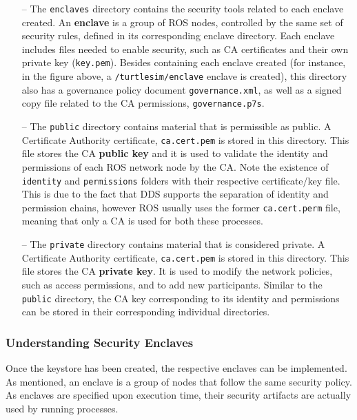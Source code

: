 \begin{itemize}
    \item[--] The \texttt{enclaves} directory contains the security tools related to each enclave created. An \textbf{enclave} is a group of ROS nodes, controlled by the same set of security rules, defined in its corresponding enclave directory. Each enclave includes files needed to enable security, such as CA certificates and their own private key (\texttt{key.pem}). Besides containing each enclave created (for instance, in the figure above, a \texttt{/turtlesim/enclave} enclave is created), this directory also has a governance policy document \texttt{governance.xml}, as well as a signed copy file related to the CA permissions, \texttt{governance.p7s}. 
    \item[--] The \texttt{public} directory contains material that is permissible as public. A Certificate Authority certificate, \texttt{ca.cert.pem} is stored in this directory. This file stores the CA \textbf{public key} and it is used to validate the identity and permissions of each ROS network node by the CA. Note the existence of \texttt{identity} and \texttt{permissions} folders with their respective certificate/key file. This is due to the fact that DDS supports the separation of identity and permission chains, however ROS usually uses the former \texttt{ca.cert.perm} file, meaning that only a CA is used for both these processes.
    \item[--] The \texttt{private} directory contains material that is considered private. A Certificate Authority certificate, \texttt{ca.cert.pem} is stored in this directory. This file stores the CA \textbf{private key}. It is used to modify the network policies, such as access permissions, and to add new participants. Similar to the \texttt{public} directory, the CA key corresponding to its identity and permissions can be stored in their corresponding individual directories.
\end{itemize}
            
\subsubsection{Understanding Security Enclaves}

Once the keystore has been created, the respective enclaves can be implemented. As mentioned, an enclave is a group of nodes that follow the same security policy. As enclaves are specified upon execution time, their security artifacts are actually used by running processes.


